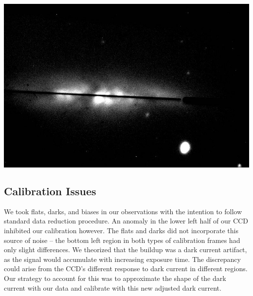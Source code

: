 \documentclass[useAMS,usenatbib]{mn2e}
\begin{document}
\includegraphics[width=\linewidth]{M82-guiding-cam.jpg}


\subsection*{Calibration Issues}
We took flats, darks, and biases in our observations with the intention to follow standard data reduction procedure. An anomaly in the lower left half of our CCD inhibited our calibration however. The flats and darks did not incorporate this source of noise -- the bottom left region in both types of calibration frames had only slight differences. We theorized that the buildup was a dark current artifact, as the signal would accumulate with increasing exposure time. The discrepancy could arise from the CCD's different response to dark current in different regions. Our strategy to account for this was to approximate the shape of the dark current with our data and calibrate with this new adjusted dark current.
\end{document}
